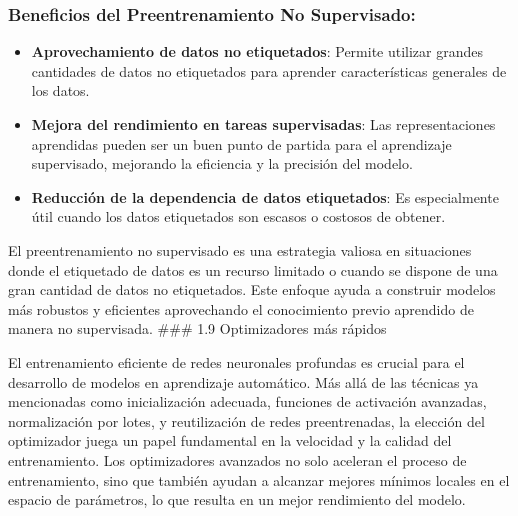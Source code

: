 \documentclass[11pt]{article}
\begin{document}
\subsubsection{Beneficios del Preentrenamiento No Supervisado:}
\label{sec:org9ab8c3c}
\begin{itemize}
\item \textbf{Aprovechamiento de datos no etiquetados}: Permite utilizar grandes
cantidades de datos no etiquetados para aprender características
generales de los datos.
\item \textbf{Mejora del rendimiento en tareas supervisadas}: Las representaciones
aprendidas pueden ser un buen punto de partida para el aprendizaje
supervisado, mejorando la eficiencia y la precisión del modelo.
\item \textbf{Reducción de la dependencia de datos etiquetados}: Es especialmente
útil cuando los datos etiquetados son escasos o costosos de obtener.
\end{itemize}

El preentrenamiento no supervisado es una estrategia valiosa en
situaciones donde el etiquetado de datos es un recurso limitado o cuando
se dispone de una gran cantidad de datos no etiquetados. Este enfoque
ayuda a construir modelos más robustos y eficientes aprovechando el
conocimiento previo aprendido de manera no supervisada. \#\#\# 1.9
Optimizadores más rápidos

El entrenamiento eficiente de redes neuronales profundas es crucial para
el desarrollo de modelos en aprendizaje automático. Más allá de las
técnicas ya mencionadas como inicialización adecuada, funciones de
activación avanzadas, normalización por lotes, y reutilización de redes
preentrenadas, la elección del optimizador juega un papel fundamental en
la velocidad y la calidad del entrenamiento. Los optimizadores avanzados
no solo aceleran el proceso de entrenamiento, sino que también ayudan a
alcanzar mejores mínimos locales en el espacio de parámetros, lo que
resulta en un mejor rendimiento del modelo.
\end{document}
